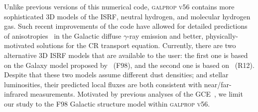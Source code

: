 \documentclass[doublespace,nopageskip]{VTthesis} %
\begin{document}
Unlike previous versions of this numerical code, \textsc{galprop v56}  contains more sophisticated 3D models of the ISRF, 
neutral hydrogen, and molecular hydrogen gas. Such recent improvements of the code have allowed for detailed predictions of anisotropies~\citep{Porter:2017vaa,Johannesson:2018bit} in the Galactic diffuse $\gamma$-ray emission and better, physically-motivated solutions for the CR transport equation.
%
 Currently, there are two alternative 3D ISRF models that are available to the user: the first one is based on the Galaxy model proposed by~\cite{Freudenreich:1998} (F98), and the second one is based on~\cite{R12} (R12). Despite that these two models assume different dust densities; and stellar luminosities, their predicted local fluxes are both consistent with near/far-infrared measurements. Motivated by previous analyses of the GCE~\citep{Macias:2016nev,Bartels:2017vsx,Macias:2019omb}, we limit our study to the F98 Galactic structure model within \textsc{galprop v56}.  
\end{document}
